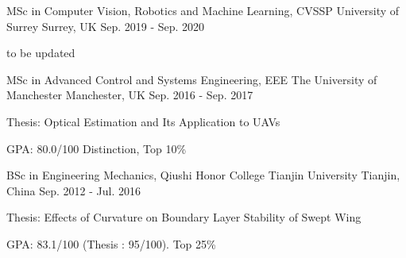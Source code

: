

\begin{cventries}

   \cventry
    {MSc in Computer Vision, Robotics and Machine Learning,  CVSSP} %
    {University of Surrey} %
    {Surrey, UK} %
    {Sep. 2019 - Sep. 2020} %
    {
      \begin{cvitems} %
        \item {to be updated}
      \end{cvitems}
    }
  \cventry
    {MSc in Advanced Control and Systems Engineering,  EEE} %
    {The University of Manchester} %
    {Manchester, UK} %
    {Sep. 2016 - Sep. 2017} %
    {
      \begin{cvitems} %
        \item {Thesis: Optical Estimation and Its Application to UAVs}
        \item {GPA: 80.0/100 Distinction, Top 10\%}
      \end{cvitems}
    }

  \cventry
    {BSc in Engineering Mechanics, Qiushi Honor College} %
    {Tianjin University} %
    {Tianjin, China} %
    {Sep. 2012 - Jul. 2016} %
    {
      \begin{cvitems} %
        \item {Thesis: Effects of Curvature on Boundary Layer Stability of Swept Wing}
        \item {GPA: 83.1/100 (Thesis : 95/100). Top 25\%}
      \end{cvitems}
    }
\end{cventries}
